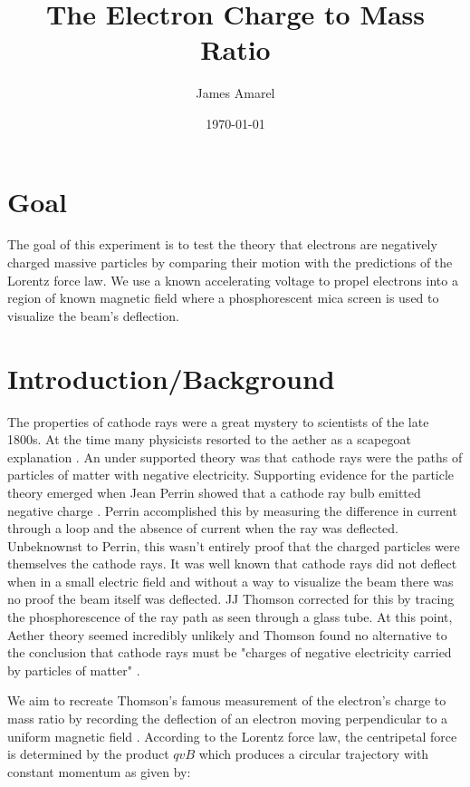 \documentclass[12pt]{article}
\begin{document}
\title{The Electron Charge to Mass Ratio}
\author{James Amarel}
\date{\today}

\maketitle

\section{Goal}
The goal of this experiment is to test the theory that electrons are negatively charged massive particles by comparing their motion with the predictions of the Lorentz force law. We use a known accelerating voltage to propel electrons into a region of known magnetic field where a phosphorescent mica screen is used to visualize the beam's deflection.

\section{Introduction/Background}
	The properties of cathode rays were a great mystery to scientists of the late 1800s. At the time many physicists resorted to the aether as a scapegoat explanation \cite{Thomson2010CathodeRays}. An under supported theory was that cathode rays were the paths of particles of matter with negative electricity. Supporting evidence for the particle theory emerged when Jean Perrin showed that a cathode ray bulb emitted negative charge \cite{Thomson2010CathodeRays}. Perrin accomplished this by measuring the difference in current through a loop and the absence of current when the ray was deflected. Unbeknownst to Perrin, this wasn't entirely proof that the charged particles were themselves the cathode rays. It was well known that cathode rays did not deflect when in a small electric field and without a way to visualize the beam there was no proof the beam itself was deflected. JJ Thomson corrected for this by tracing the phosphorescence of the ray path as seen through a glass tube. At this point, Aether theory seemed incredibly unlikely and Thomson found no alternative to the conclusion that cathode rays must be "charges of negative electricity carried by particles of matter" \cite{Thomson2010CathodeRays}.
    
We aim to recreate Thomson's famous measurement of the electron's charge to mass ratio by recording the deflection of an electron moving perpendicular to a uniform magnetic field \cite{Griffiths2013IntroductionElectrodynamics}. According to the Lorentz force law, the centripetal force is determined by the product $qvB$ which produces a circular trajectory with constant momentum as given by:
\end{document}
